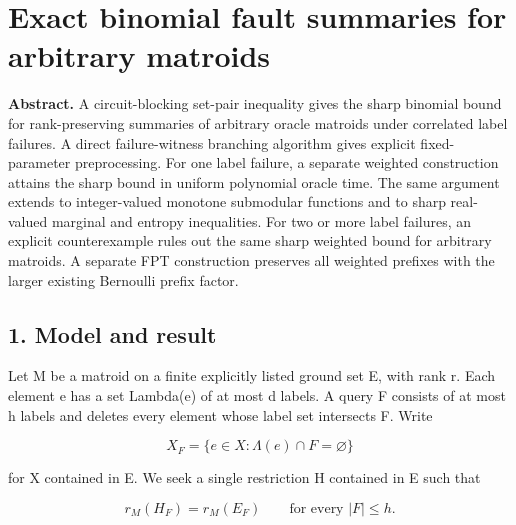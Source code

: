 
\hypertarget{af-4c0863a692-exact-binomial-fault-summaries-for-arbitrary-matroids}{%
\section{Exact binomial fault summaries for arbitrary matroids}\label{af-4c0863a692-exact-binomial-fault-summaries-for-arbitrary-matroids}}

\textbf{Abstract.} A circuit-blocking set-pair inequality gives the sharp binomial bound for rank-preserving summaries of arbitrary oracle matroids under correlated label failures. A direct failure-witness branching algorithm gives explicit fixed-parameter preprocessing. For one label failure, a separate weighted construction attains the sharp bound in uniform polynomial oracle time. The same argument extends to integer-valued monotone submodular functions and to sharp real-valued marginal and entropy inequalities. For two or more label failures, an explicit counterexample rules out the same sharp weighted bound for arbitrary matroids. A separate FPT construction preserves all weighted prefixes with the larger existing Bernoulli prefix factor.

\hypertarget{af-4c0863a692-model-and-result}{%
\subsection{1. Model and result}\label{af-4c0863a692-model-and-result}}

Let M be a matroid on a finite explicitly listed ground set E, with rank r. Each element e has a set Lambda(e) of at most d labels. A query F consists of at most h labels and deletes every element whose label set intersects F. Write

\[
X_F=\{e\in X: \Lambda(e)\cap F=\varnothing\}
\]

for X contained in E. We seek a single restriction H contained in E such that

\[
r_M(H_F)=r_M(E_F)\qquad\text{for every }|F|\le h. \tag{1}
\]

